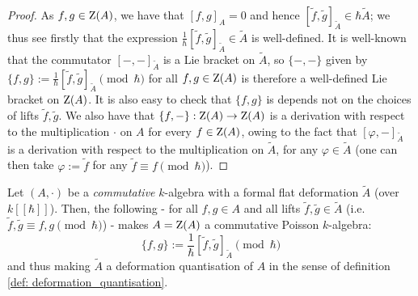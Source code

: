                 \begin{proof}
                    As $f, g \in \mathrm{Z}(A)$, we have that $[f, g]_A = 0$ and hence $[\tilde{f}, \tilde{g}]_{\tilde{A}} \in \hbar \tilde{A}$; we thus see firstly that the expression $\frac{1}{\hbar}[\tilde{f}, \tilde{g}]_{\tilde{A}} \in \tilde{A}$ is well-defined. It is well-known that the commutator $[-, -]_{\tilde{A}}$ is a Lie bracket on $\tilde{A}$, so $\{-, -\}$ given by $\{f, g\} := \frac{1}{\hbar}[\tilde{f}, \tilde{g}]_{\tilde{A}} \pmod{\hbar}$ for all $f, g \in \mathrm{Z}(A)$ is therefore a well-defined Lie bracket on $\mathrm{Z}(A)$. It is also easy to check that $\{f, g\}$ is depends not on the choices of lifts $\tilde{f}, \tilde{g}$. We also have that $\{f, -\}: \mathrm{Z}(A) \to \mathrm{Z}(A)$ is a derivation with respect to the multiplication $\cdot$ on $A$ for every $f \in \mathrm{Z}(A)$, owing to the fact that $[\varphi, -]_{\tilde{A}}$ is a derivation with respect to the multiplication on $\tilde{A}$, for any $\varphi \in \tilde{A}$ (one can then take $\varphi := \tilde{f}$ for any $\tilde{f} \equiv f \pmod{\hbar}$).
                \end{proof}
            \begin{corollary} \label{coro: deformation_quantisation_of_poisson_algebras_from_formal_flat_deformations}
                Let $(A, \cdot)$ be a \textit{commutative} $k$-algebra with a formal flat deformation $\tilde{A}$ (over $k[\![\hbar]\!]$). Then, the following - for all $f, g \in A$ and all lifts $\tilde{f}, \tilde{g} \in \tilde{A}$ (i.e. $\tilde{f}, \tilde{g} \equiv f, g \pmod{\hbar}$) - makes $A = \mathrm{Z}(A)$ a commutative Poisson $k$-algebra:
                    $$\{f, g\} := \frac{1}{\hbar}[\tilde{f}, \tilde{g}]_{\tilde{A}} \pmod{\hbar}$$
                and thus making $\tilde{A}$ a deformation quantisation of $A$ in the sense of definition \ref{def: deformation_quantisation}.
            \end{corollary}
